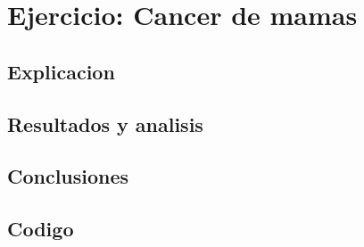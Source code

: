 \section{Ejercicio: Cancer de mamas}
\subsection{Explicacion}
\subsection{Resultados y analisis}
\subsection{Conclusiones}
\subsection{Codigo}